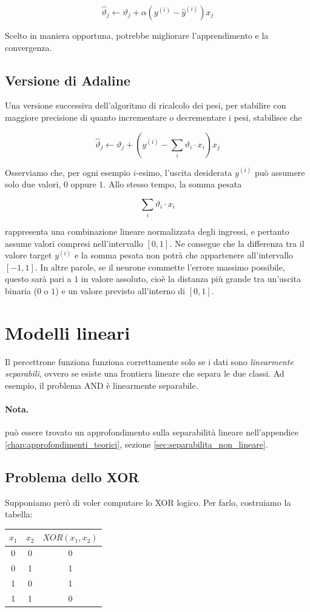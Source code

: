 $$
\hat{\vartheta}_j \leftarrow \vartheta_j + \alpha( y^{(i)} -\hat{y}^{(i)})x_j
$$

\noindent
Scelto in maniera opportuna, potrebbe migliorare l'apprendimento e la convergenza.

\subsection{Versione di Adaline}

Una versione successiva dell'algoritmo di ricalcolo dei pesi, per stabilire con maggiore precisione di quanto incrementare o decrementare i pesi, stabilisce che

$$
\hat{\vartheta}_j \leftarrow \vartheta_j + \left( y^{(i)} - \sum_{i}\vartheta_i \cdot x_i\right)x_j
$$

\noindent
Osserviamo che, per ogni esempio $i$-esimo, l'uscita desiderata $y^{(i)}$ può assumere solo due valori, $0$ oppure $1$. Allo stesso tempo, la somma pesata 

\[
\sum_i \vartheta_i \cdot x_i
\]

\noindent
rappresenta una combinazione lineare normalizzata degli ingressi, e pertanto assume valori compresi nell'intervallo $[0,1]$.  Ne consegue che la differenza tra il valore target $y^{(i)}$ e la somma pesata non potrà che appartenere all'intervallo $[-1,1]$. In altre parole, se il neurone commette l'errore massimo possibile, questo sarà pari a $1$ in valore assoluto, cioè la distanza più grande tra un'uscita binaria ($0$ o $1$) e un valore previsto all'interno di $[0,1]$.

\section{Modelli lineari}\label{sec:modelli_lineari}
Il percettrone funziona funziona correttamente solo se i dati sono \emph{linearmente separabili}, ovvero se esiste una frontiera lineare che separa le due classi. Ad esempio, il problema AND è linearmente separabile.

\paragraph{Nota.} può essere trovato un approfondimento sulla separabilità lineare nell'appendice \ref{chap:approfondimenti_teorici}, sezione \ref{sec:separabilita_non_lineare}.

\subsection{Problema dello XOR}
Supponiamo però di voler computare lo XOR logico. Per farlo, costruiamo la tabella: 
\begin{center}
	\begin{tabular}{|c|c|c|}
		\hline
		\(x_1\) & \(x_2\) & \(XOR(x_1,x_2)\)\\
		\hline
		0 & 0 & 0\\
		0 & 1 & 1\\
		1 & 0 & 1\\
		1 & 1 & 0\\
		\hline
	\end{tabular}
\end{center}

